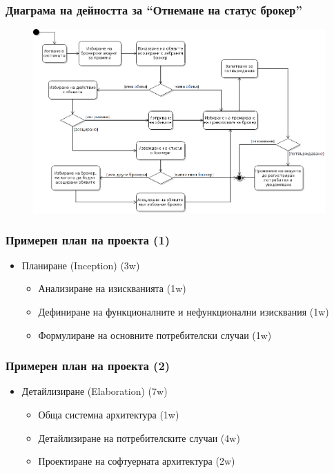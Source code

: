 \documentclass[12pt]{beamer}
\begin{document}
\begin{frame}[fragile]
\frametitle{Диаграма на дейността за ``Отнемане на статус брокер''}
        \begin{figure}[h]
        \centering
		\includegraphics[scale=0.30,keepaspectratio=true]{uml10}
        \end{figure}
\end{frame}

\begin{frame}[fragile]
\frametitle{Примерен план на проекта (1)}
\begin{itemize}

\item {Планиране (Inception) (3w) %
\begin{itemize}
\item Анализиране на изискванията (1w)
\item Дефиниране на функционалните и нефункционални изисквания (1w)
\item Формулиране на основните потребителски случаи (1w)
\end{itemize}
}
\end{itemize}
\end{frame}

\begin{frame}[fragile]
\frametitle{Примерен план на проекта (2)}
\begin{itemize}
\item {Детайлизиране (Elaboration) (7w) %
\begin{itemize}
\item Обща системна архитектура (1w)
\item Детайлизиране на потребителските случаи (4w)
\item Проектиране на софтуерната архитектура (2w)
\end{itemize}
}
\end{itemize}
\end{frame}
\end{document}
